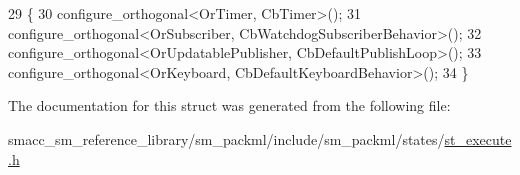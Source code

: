 \begin{DoxyCode}
29     \{
30         configure\_orthogonal<OrTimer, CbTimer>();
31         configure\_orthogonal<OrSubscriber, CbWatchdogSubscriberBehavior>();
32         configure\_orthogonal<OrUpdatablePublisher, CbDefaultPublishLoop>();
33         configure\_orthogonal<OrKeyboard, CbDefaultKeyboardBehavior>();
34     \}
\end{DoxyCode}


The documentation for this struct was generated from the following file\+:\begin{DoxyCompactItemize}
\item 
smacc\+\_\+sm\+\_\+reference\+\_\+library/sm\+\_\+packml/include/sm\+\_\+packml/states/\hyperlink{st__execute_8h}{st\+\_\+execute.\+h}\end{DoxyCompactItemize}
